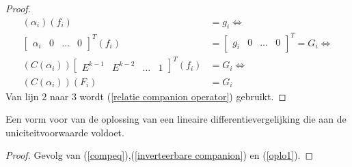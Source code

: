 \documentclass[a4paper,12pt]{article}
\begin{document}
\begin{proof}
    \begin{align*}
        (\alpha_i)(f_i)            & = g_i    \Leftrightarrow    \\
        \left[\begin{array}{cccc}
                      \alpha_{i} &
                      0          &
                      \hdots     &
                      0
                  \end{array}\right]^T (f_i) & =
        \left[\begin{array}{cccc}
                      g_i    &
                      0      &
                      \hdots &
                      0
                  \end{array}\right]^T = G_i      \Leftrightarrow    \\
        \left(
        C(\alpha_i) \right)
        \left[\begin{array}{cccc}
                      E^{k-1} &
                      E^{k-2} &
                      \hdots  &
                      1
                  \end{array}\right]^T(f_i)  & = G_i \Leftrightarrow \\
        \left(
        C(\alpha_i) \right) (F_i)  & = G_i
    \end{align*}
    Van lijn $2$ naar $3$ wordt (\ref{relatie companion operator}) gebruikt.
\end{proof}

\begin{corollary}
    \label{oplok}
    Een vorm voor van de oplossing van een lineaire differentievergelijking die aan de uniciteitvoorwaarde voldoet.
\end{corollary}

\begin{proof}
    Gevolg van (\ref{compeq}),(\ref{inverteerbare companion}) en (\ref{oplo1}).
\end{proof}
\end{document}
